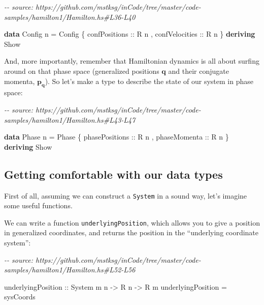 \documentclass[]{article}
\newenvironment{Shaded}{}{}
\newcommand{\CommentTok}[1]{\textcolor[rgb]{0.38,0.63,0.69}{\textit{#1}}}
\newcommand{\DataTypeTok}[1]{\textcolor[rgb]{0.56,0.13,0.00}{#1}}
\newcommand{\KeywordTok}[1]{\textcolor[rgb]{0.00,0.44,0.13}{\textbf{#1}}}
\newcommand{\NormalTok}[1]{#1}
\newcommand{\OtherTok}[1]{\textcolor[rgb]{0.00,0.44,0.13}{#1}}
\begin{document}
\begin{Shaded}
\begin{Highlighting}[]
\CommentTok{{-}{-} source: https://github.com/mstksg/inCode/tree/master/code{-}samples/hamilton1/Hamilton.hs\#L36{-}L40}

\KeywordTok{data} \DataTypeTok{Config}\NormalTok{ n }\OtherTok{=} \DataTypeTok{Config}
\NormalTok{    \{}\OtherTok{ confPositions  ::} \DataTypeTok{R}\NormalTok{ n}
\NormalTok{    ,}\OtherTok{ confVelocities ::} \DataTypeTok{R}\NormalTok{ n}
\NormalTok{    \}}
  \KeywordTok{deriving} \DataTypeTok{Show}
\end{Highlighting}
\end{Shaded}

And, more importantly, remember that Hamiltonian dynamics is all about surfing
around on that phase space (generalized positions \(\mathbf{q}\) and their
conjugate momenta, \(\mathbf{p_q}\)). So let's make a type to describe the state
of our system in phase space:

\begin{Shaded}
\begin{Highlighting}[]
\CommentTok{{-}{-} source: https://github.com/mstksg/inCode/tree/master/code{-}samples/hamilton1/Hamilton.hs\#L43{-}L47}

\KeywordTok{data} \DataTypeTok{Phase}\NormalTok{ n }\OtherTok{=} \DataTypeTok{Phase}
\NormalTok{    \{}\OtherTok{ phasePositions ::} \DataTypeTok{R}\NormalTok{ n}
\NormalTok{    ,}\OtherTok{ phaseMomenta   ::} \DataTypeTok{R}\NormalTok{ n}
\NormalTok{    \}}
  \KeywordTok{deriving} \DataTypeTok{Show}
\end{Highlighting}
\end{Shaded}

\hypertarget{getting-comfortable-with-our-data-types}{%
\subsection{Getting comfortable with our data
types}\label{getting-comfortable-with-our-data-types}}

First of all, assuming we can construct a \texttt{System} in a sound way, let's
imagine some useful functions.

We can write a function \texttt{underlyingPosition}, which allows you to give a
position in generalized coordinates, and returns the position in the
``underlying coordinate system'':

\begin{Shaded}
\begin{Highlighting}[]
\CommentTok{{-}{-} source: https://github.com/mstksg/inCode/tree/master/code{-}samples/hamilton1/Hamilton.hs\#L52{-}L56}

\NormalTok{underlyingPosition}
\OtherTok{    ::} \DataTypeTok{System}\NormalTok{ m n}
    \OtherTok{{-}>} \DataTypeTok{R}\NormalTok{ n}
    \OtherTok{{-}>} \DataTypeTok{R}\NormalTok{ m}
\NormalTok{underlyingPosition }\OtherTok{=}\NormalTok{ sysCoords}
\end{Highlighting}
\end{Shaded}
\end{document}
